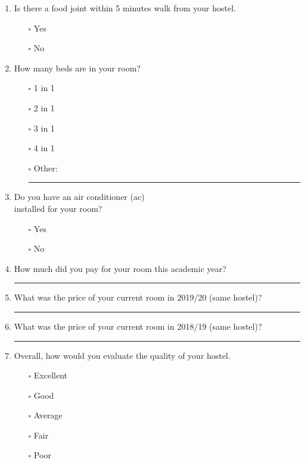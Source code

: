 \documentclass[12pt,a4paper]{article}
\begin{document}
\begin{multicols}{2}
\begin{enumerate}
		\item Is there a food joint within 5 minutes walk from your hostel.
			\begin{itemize}
				\item[$\square$] Yes
				\item[$\square$] No
			\end{itemize}

		\item How many beds are in your room?
			\begin{itemize}
				\item[$\square$] 1 in 1
				\item[$\square$] 2 in 1
				\item[$\square$] 3 in 1
				\item[$\square$] 4 in 1
				\item[$\square$] Other: \rule{2cm}{0.1mm}
			\end{itemize}
		
		\item Do you have an air conditioner (ac) \\ installed for your room?
			\begin{itemize}
				\item[$\square$] Yes
				\item[$\square$] No
			\end{itemize}
		
		\item How much did you pay for your room this academic year?
		\\ \rule[-0.3cm]{3.5cm}{0.1mm}
		
		\item What was the price of your current room in 2019/20 (same hostel)?
		\\ \rule[-0.3cm]{3.5cm}{0.1mm}
		
		\item What was the price of your current room in 2018/19 (same hostel)?
		\\ \rule[-0.3cm]{3.5cm}{0.1mm}
		
		\item Overall, how would you evaluate the quality of your hostel.
		\begin{itemize}
			\item[$\square$] Excellent
			\item[$\square$] Good
			\item[$\square$] Average
			\item[$\square$] Fair
			\item[$\square$] Poor
		\end{itemize}
	\end{enumerate}

%
\end{multicols}
\end{document}
